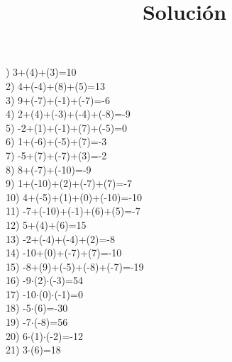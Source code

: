 \documentclass[a4paper,10pt]{article}
\title{Solución}
\author{}
\date{}
\begin{document}
)   3+(4)+(3)=10
\vspace{0.5cm}\\2)   4+(-4)+(8)+(5)=13
\vspace{0.5cm}\\3)   9+(-7)+(-1)+(-7)=-6
\vspace{0.5cm}\\4)   2+(4)+(-3)+(-4)+(-8)=-9
\vspace{0.5cm}\\5)   -2+(1)+(-1)+(7)+(-5)=0
\vspace{0.5cm}\\6)   1+(-6)+(-5)+(7)=-3
\vspace{0.5cm}\\7)   -5+(7)+(-7)+(3)=-2
\vspace{0.5cm}\\8)   8+(-7)+(-10)=-9
\vspace{0.5cm}\\9)   1+(-10)+(2)+(-7)+(7)=-7
\vspace{0.5cm}\\10)   4+(-5)+(1)+(0)+(-10)=-10
\vspace{0.5cm}\\11)   -7+(-10)+(-1)+(6)+(5)=-7
\vspace{0.5cm}\\12)   5+(4)+(6)=15
\vspace{0.5cm}\\13)   -2+(-4)+(-4)+(2)=-8
\vspace{0.5cm}\\14)   -10+(0)+(-7)+(7)=-10
\vspace{0.5cm}\\15)   -8+(9)+(-5)+(-8)+(-7)=-19
\vspace{0.5cm}\\16)   -9$\cdot$(2)$\cdot$(-3)=54
\vspace{0.5cm}\\17)   -10$\cdot$(0)$\cdot$(-1)=0
\vspace{0.5cm}\\18)   -5$\cdot$(6)=-30
\vspace{0.5cm}\\19)   -7$\cdot$(-8)=56
\vspace{0.5cm}\\20)   6$\cdot$(1)$\cdot$(-2)=-12
\vspace{0.5cm}\\21)   3$\cdot$(6)=18
\end{document}
